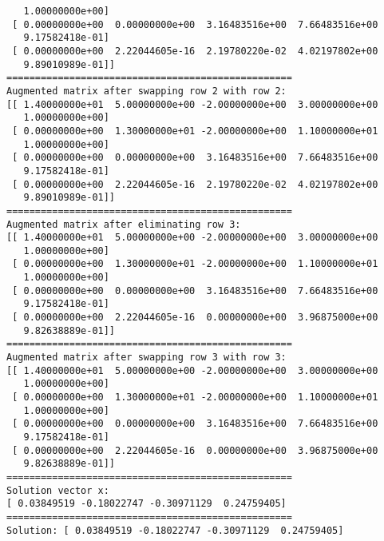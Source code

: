 \documentclass{article}
\begin{document}
\begin{lstlisting}
   1.00000000e+00]
 [ 0.00000000e+00  0.00000000e+00  3.16483516e+00  7.66483516e+00
   9.17582418e-01]
 [ 0.00000000e+00  2.22044605e-16  2.19780220e-02  4.02197802e+00
   9.89010989e-01]]
==================================================
Augmented matrix after swapping row 2 with row 2:
[[ 1.40000000e+01  5.00000000e+00 -2.00000000e+00  3.00000000e+00
   1.00000000e+00]
 [ 0.00000000e+00  1.30000000e+01 -2.00000000e+00  1.10000000e+01
   1.00000000e+00]
 [ 0.00000000e+00  0.00000000e+00  3.16483516e+00  7.66483516e+00
   9.17582418e-01]
 [ 0.00000000e+00  2.22044605e-16  2.19780220e-02  4.02197802e+00
   9.89010989e-01]]
==================================================
Augmented matrix after eliminating row 3:
[[ 1.40000000e+01  5.00000000e+00 -2.00000000e+00  3.00000000e+00
   1.00000000e+00]
 [ 0.00000000e+00  1.30000000e+01 -2.00000000e+00  1.10000000e+01
   1.00000000e+00]
 [ 0.00000000e+00  0.00000000e+00  3.16483516e+00  7.66483516e+00
   9.17582418e-01]
 [ 0.00000000e+00  2.22044605e-16  0.00000000e+00  3.96875000e+00
   9.82638889e-01]]
==================================================
Augmented matrix after swapping row 3 with row 3:
[[ 1.40000000e+01  5.00000000e+00 -2.00000000e+00  3.00000000e+00
   1.00000000e+00]
 [ 0.00000000e+00  1.30000000e+01 -2.00000000e+00  1.10000000e+01
   1.00000000e+00]
 [ 0.00000000e+00  0.00000000e+00  3.16483516e+00  7.66483516e+00
   9.17582418e-01]
 [ 0.00000000e+00  2.22044605e-16  0.00000000e+00  3.96875000e+00
   9.82638889e-01]]
==================================================
Solution vector x:
[ 0.03849519 -0.18022747 -0.30971129  0.24759405]
==================================================
Solution: [ 0.03849519 -0.18022747 -0.30971129  0.24759405]
        \end{lstlisting}
\end{document}
